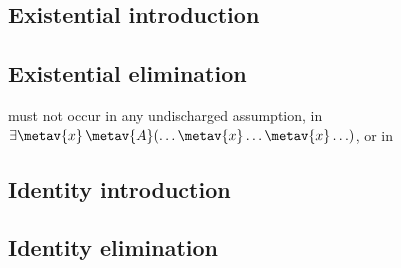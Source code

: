 \begin{multicols}{2}
\subsection*{Existential introduction}

\begin{fitchproof}
\end{fitchproof}

\vfill\null\columnbreak

\subsection*{Existential elimination}

\begin{fitchproof}
	\open	
		\AS
	\close
\end{fitchproof}
\begin{raggedright}
\noindent {} must not occur in any undischarged assumption, in $\exists \metav{x}\,\metav{A}(\ldots \metav{x} \ldots \metav{x}\ldots)$, or in \end{raggedright}
\end{multicols}

\subsection*{Identity introduction}

\begin{fitchproof}
	 
\end{fitchproof}


\subsection*{Identity elimination}

\begin{multicols}{2}
\begin{fitchproof}
	 
\end{fitchproof}
\begin{fitchproof}
	 
\end{fitchproof}
\end{multicols}

